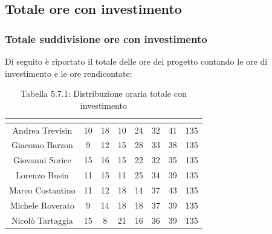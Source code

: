 \subsection{Totale ore con investimento}

\subsubsection{Totale suddivisione ore con investimento}
Di seguito è riportato il totale delle ore del progetto contando le ore di investimento e le ore rendicontate:

\renewcommand{\arraystretch}{1.5}
\begin{table}[H]
\begin{center}
\begin{tabular}{|c|c|c|c|c|c|c|c|}
\hline
\rowcolor{title_row}
\textbf{\color{title_text}{Nome}} & \textbf{\color{title_text}{Resp.}} & \textbf{\color{title_text}{Ammi.}} & \textbf{\color{title_text}{Analist.}} & \textbf{\color{title_text}{Progett.}} & \textbf{\color{title_text}{Program.}} & \textbf{\color{title_text}{Verific.}} & \textbf{\color{title_text}{Totale}} \\ \hline
Andrea Trevisin  & 10 & 18 & 10 & 24 & 32 & 41 & 135 \\ \hline
Giacomo Barzon   & 9 & 12 & 15 & 28 & 33 & 38 & 135 \\ \hline
Giovanni Sorice  & 15 & 16 & 15 & 22 & 32 & 35 & 135 \\ \hline
Lorenzo Busin    & 11 & 15 & 11 & 25 & 34 & 39 & 135 \\ \hline
Marco Costantino & 11 & 12 & 18 & 14 & 37 & 43 & 135 \\ \hline
Michele Roverato & 9 & 14 & 18 & 18 & 37 & 39 & 135 \\ \hline
Nicolò Tartaggia & 15 & 8 & 21 & 16 & 36 & 39 & 135  \\ \hline
\end{tabular}
\caption{Tabella 5.7.1: Distribuzione oraria totale con investimento\label{}}
\end{center}
\end{table}
\renewcommand{\arraystretch}{1}


